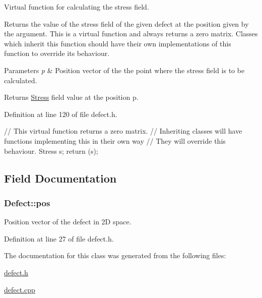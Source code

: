 \-Virtual function for calculating the stress field. 

\-Returns the value of the stress field of the given defect at the position given by the argument. \-This is a virtual function and always returns a zero matrix. \-Classes which inherit this function should have their own implementations of this function to override its behaviour. 
\begin{DoxyParams}{\-Parameters}
{\em p} & \-Position vector of the the point where the stress field is to be calculated. \\
\hline
\end{DoxyParams}
\begin{DoxyReturn}{\-Returns}
\hyperlink{classStress}{\-Stress} field value at the position p. 
\end{DoxyReturn}


\-Definition at line 120 of file defect.\-h.


\begin{DoxyCode}
  {
    // This virtual function returns a zero matrix.
    // Inheriting classes will have functions implementing this in their own
       way
    // They will override this behaviour.
    Stress s;
    return (s);
  }
\end{DoxyCode}


\subsection{\-Field \-Documentation}
\hypertarget{classDefect_aed2731c1beefc22e3db6ad5b18194cdd}{
\subsubsection[{pos}]{ {\bf \-Defect\-::pos}}}\label{d5/d4f/classDefect_aed2731c1beefc22e3db6ad5b18194cdd}


\-Position vector of the defect in 2\-D space. 



\-Definition at line 27 of file defect.\-h.



\-The documentation for this class was generated from the following files\-:\begin{DoxyCompactItemize}
\item 
\hyperlink{defect_8h}{defect.\-h}\item 
\hyperlink{defect_8cpp}{defect.\-cpp}\end{DoxyCompactItemize}
